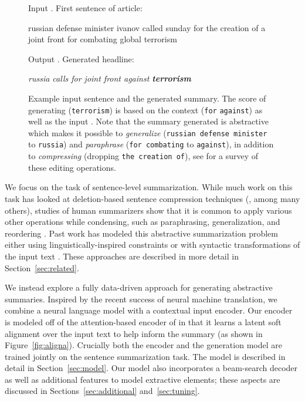 \documentclass[11pt,a4paper]{article}
\begin{document}
\begin{figure*}[t!]
  \small 
  \begin{framed}
    
    Input . First sentence of article:
    
    russian defense minister ivanov called sunday for the creation of a joint front for combating global terrorism
    \vspace{0.1cm}
    
    Output . Generated headline:

    \textit{russia calls for joint front against \textbf{terrorism}}  \hspace*{0.5cm}  \hspace*{0.5cm}   
  \end{framed}
  \caption{\small \label{fig:sumex} Example input sentence and the generated summary. The score of generating 
    (\texttt{terrorism}) is based on the context 
    (\texttt{for}  \texttt{against}) as well as the input . 
    Note that the summary generated is abstractive which makes it possible to \textit{generalize} (\texttt{russian defense minister} to \texttt{russia}) and \textit{paraphrase} (\texttt{for combating} to \texttt{against}), in addition to \textit{compressing}  (dropping \texttt{the creation of}), see  for a survey of these editing operations.}
\end{figure*}


We focus on the task of sentence-level summarization.
While much work on this task has looked at deletion-based sentence
compression techniques (, among many others), studies of
human summarizers show that it is common to apply various other
operations while condensing, such as paraphrasing, generalization, and reordering  \cite{jing2002using}. Past work has
modeled this abstractive summarization problem either using
linguistically-inspired constraints \cite{dorr2003hedge,zajic2004bbn}
or with syntactic transformations of the
input text \cite{cohn2008sentence,woodsend2010generation}.
These approaches are described in more detail in Section~\ref{sec:related}.


We instead explore a fully data-driven approach for generating
abstractive summaries. Inspired by the recent success
 of neural machine translation, we combine a neural
language model with a contextual input encoder. Our encoder
is modeled off of the attention-based encoder of
 in that it learns a latent soft alignment
over the input text to help inform the summary (as shown in Figure~\ref{fig:aligna}). Crucially both the
encoder and the generation model are trained jointly on the sentence
summarization task.  The model is described in detail in
Section~\ref{sec:model}. Our model also incorporates
a beam-search decoder as well as additional features to model extractive elements; these aspects are discussed in
Sections~\ref{sec:additional} and~\ref{sec:tuning}.
\end{document}
